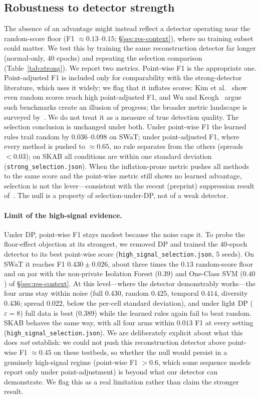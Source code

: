 \documentclass[pdflatex,sn-mathphys-num]{sn-jnl}
\theoremstyle{thmstyleone}
\theoremstyle{thmstyletwo}
\theoremstyle{thmstylethree}
\begin{document}
\subsection{Robustness to detector strength}\label{sec:res-strong}
The absence of an advantage might instead reflect a detector
operating near the random-score floor (F1 $\approx0.13$--$0.15$;
\S\ref{sec:res-context}), where no training subset could matter. We test this by
training the same reconstruction detector far longer (normal-only, $40$ epochs) and
repeating the selection comparison (Table~\ref{tab:strong}). We report two metrics.
Point-wise F1 is the appropriate one. Point-adjusted F1 is included only for comparability
with the strong-detector literature, which uses it widely; we flag that it inflates
scores: Kim et al.~\cite{kim2022rigorous} show even random scores reach high
point-adjusted F1, and Wu and Keogh~\cite{wu2021flawed} argue such benchmarks create
an illusion of progress; the broader metric landscape is surveyed
by~\cite{sorbo2024navigating}. We do not treat it as a measure of true detection
quality. The
selection conclusion is unchanged under both. Under point-wise F1 the learned rules
trail random by $0.036$--$0.098$ on SWaT; under point-adjusted F1, where every method
is pushed to $\approx0.65$, no rule separates from the others (spreads $<0.03$); on
SKAB all conditions are within one standard deviation
(\texttt{strong\_selection.json}). When the inflation-prone metric pushes all methods
to the same score and the point-wise metric still shows no learned advantage, selection
is not the lever---consistent with the recent (preprint) suppression result
of~\cite{stoddard2026suppress}. The null is a property of selection-under-DP, not of a
weak detector.

\paragraph{Limit of the high-signal evidence.} Under
DP, point-wise F1 stays modest because the noise caps it. To probe the floor-effect
objection at its strongest, we removed DP and trained the $40$-epoch detector to its
best point-wise score (\texttt{high\_signal\_selection.json}, $5$ seeds). On
SWaT it reaches F1 $0.430\pm0.026$, about three times the $0.13$ random-score floor
and on par with the non-private Isolation Forest ($0.39$) and One-Class SVM ($0.40$)
of \S\ref{sec:res-context}. At this level---where the detector demonstrably
works---the four arms stay within noise (full $0.430$, random $0.425$, temporal
$0.414$, diversity $0.436$; spread $0.022$, below the per-cell standard deviation),
and under light DP ($\varepsilon{=}8$) full data is best ($0.389$) while the learned
rules again fail to beat random. SKAB behaves the same way, with all four arms within
$0.013$ F1 at every setting (\texttt{high\_signal\_selection.json}). We are
deliberately explicit about what this does
\emph{not} establish: we could not push this reconstruction detector above point-wise
F1 $\approx0.45$ on these testbeds, so whether the null would persist in a genuinely
high-signal regime (point-wise F1 $>0.6$, which some sequence models report only under
point-adjustment) is beyond what our detector can demonstrate. We flag this as a real
limitation rather than claim the stronger result.
\end{document}
